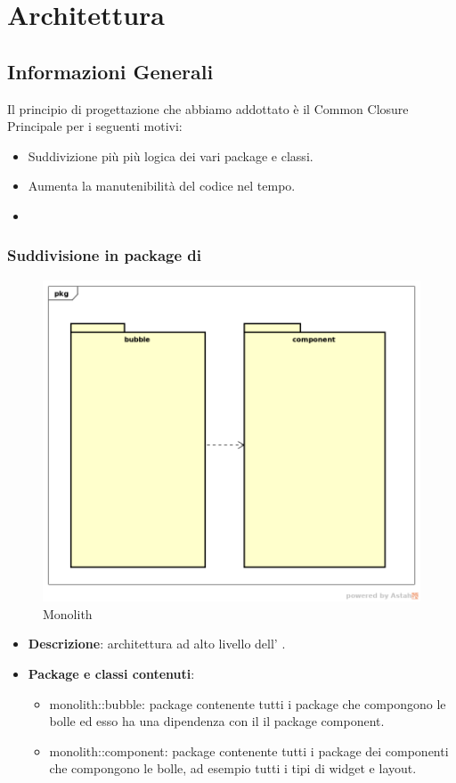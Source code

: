 \newpage
\section{Architettura}
\subsection{Informazioni Generali}
Il principio di progettazione che abbiamo addottato è il Common Closure Principale per i seguenti motivi:
\begin{itemize}
\item Suddivizione più più logica dei vari package e classi.
\item Aumenta la manutenibilità del codice nel tempo.
\item
\end{itemize}

\subsubsection{Suddivisione in package  di }
\label{Monolith}
\begin{figure}[H]
	\centering
	\includegraphics[scale=0.5]{Sezioni/imgPackage/Monolith.png}
	\caption{Monolith}
\end{figure}
\begin{itemize}
	\item{\textbf{Descrizione}}: architettura ad alto livello dell'  .
	\item{\textbf{Package e classi contenuti}}:
	\begin{itemize}
	\item{monolith::bubble}: package contenente tutti i package che compongono le bolle ed esso ha una dipendenza con il il package component.
	\item{monolith::component}: package contenente tutti i package dei componenti che compongono le bolle, ad esempio tutti i tipi di widget e layout.
	\end{itemize}

\end{itemize}


